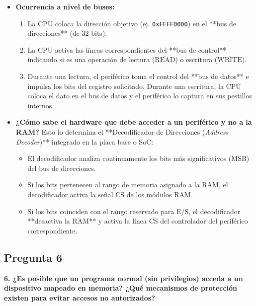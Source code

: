 \documentclass[12pt, letterpaper]{article}
\begin{document}
\begin{itemize}
    \item \textbf{Ocurrencia a nivel de buses:}
    \begin{enumerate}
        \item La CPU coloca la dirección objetivo (ej. \texttt{0xFFFF0000}) en el **bus de direcciones** (de 32 bits).
        \item La CPU activa las líneas correspondientes del **bus de control** indicando si es una operación de lectura ($\overline{\text{READ}}$) o escritura ($\overline{\text{WRITE}}$).
        \item Durante una lectura, el periférico toma el control del **bus de datos** e impulsa los bits del registro solicitado. Durante una escritura, la CPU coloca el dato en el bus de datos y el periférico lo captura en sus pestillos internos.
    \end{enumerate}
    
    \item \textbf{¿Cómo sabe el hardware que debe acceder a un periférico y no a la RAM?}
    Esto lo determina el **Decodificador de Direcciones (\textit{Address Decoder})** integrado en la placa base o SoC:
    \begin{itemize}
        \item El decodificador analiza continuamente los bits más significativos (MSB) del bus de direcciones.
        \item Si los bits pertenecen al rango de memoria asignado a la RAM, el decodificador activa la señal $\overline{\text{CS}}$ de los módulos RAM.
        \item Si los bits coinciden con el rango reservado para E/S, el decodificador **desactiva la RAM** y activa la línea $\overline{\text{CS}}$ del controlador del periférico correspondiente.
    \end{itemize}
\end{itemize}

\hr

\subsection*{Pregunta 6}
\textbf{6. ¿Es posible que un programa normal (sin privilegios) acceda a un dispositivo mapeado en memoria? ¿Qué mecanismos de protección existen para evitar accesos no autorizados?}
\end{document}
